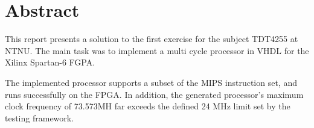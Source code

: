 \section*{Abstract}
\label{sec:abstract}

\vspace*{\fill}
This report presents a solution to the first exercise for the subject TDT4255 at NTNU.
The main task was to implement a multi cycle processor in VHDL for the Xilinx Spartan-6 FGPA.

The implemented processor supports a subset of the MIPS instruction set, and runs successfully on the FPGA.
In addition, the generated processor's maximum clock frequency of 73.573MH
far exceeds the defined 24 MHz limit set by the testing framework.
\vspace*{\fill}
